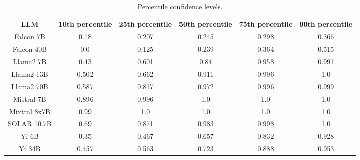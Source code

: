 \begin{table*}
\centering
\begin{tabular}{c|c|c|c|c|c}
LLM & 10th percentile & 25th percentile & 50th percentile & 75th percentile & 90th percentile\\ \hline
Falcon 7B & 0.18 & 0.207 & 0.245 & 0.298 & 0.366\\
Falcon 40B & 0.0 & 0.125 & 0.239 & 0.364 & 0.515\\
Llama2 7B & 0.43 & 0.601 & 0.84 & 0.958 & 0.991\\
Llama2 13B & 0.502 & 0.662 & 0.911 & 0.996 & 1.0\\
Llama2 70B & 0.587 & 0.817 & 0.972 & 0.996 & 0.999\\
Mistral 7B & 0.896 & 0.996 & 1.0 & 1.0 & 1.0\\
Mixtral 8x7B & 0.99 & 1.0 & 1.0 & 1.0 & 1.0\\
SOLAR 10.7B & 0.69 & 0.871 & 0.983 & 0.998 & 1.0\\
Yi 6B & 0.35 & 0.467 & 0.657 & 0.832 & 0.928\\
Yi 34B & 0.457 & 0.563 & 0.723 & 0.888 & 0.953\\
\hline
\end{tabular}
\caption{Percentile confidence levels.}
\label{tab:percentile_conf}
\end{table*}
